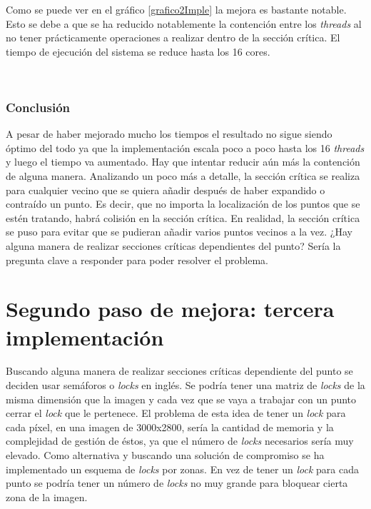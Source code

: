 Como se puede ver en el gr\'{a}fico \ref{grafico2Imple} la mejora es bastante notable. Esto se debe a que se ha reducido notablemente la contenci\'{o}n entre los \textit{threads} al no tener pr\'{a}cticamente operaciones a realizar dentro de la secci\'{o}n cr\'{i}tica. El tiempo de ejecuci\'{o}n del sistema se reduce hasta los 16 cores.

\


\subsubsection{Conclusi\'{o}n}

A pesar de haber mejorado mucho los tiempos el resultado no sigue siendo \'{o}ptimo del todo ya que la implementaci\'{o}n escala poco a poco hasta los 16 \textit{threads} y luego el tiempo va aumentado. Hay que intentar reducir a\'{u}n m\'{a}s la contenci\'{o}n de alguna manera. Analizando un poco m\'{a}s a detalle, la secci\'{o}n cr\'{i}tica se realiza para cualquier vecino que se quiera a\~{n}adir despu\'{e}s de haber expandido o contra\'{i}do un punto. Es decir, que no importa la localizaci\'{o}n de los puntos que se est\'{e}n tratando, habr\'{a} colisi\'{o}n en la secci\'{o}n cr\'{i}tica. En realidad, la secci\'{o}n cr\'{i}tica se puso para evitar que se pudieran a\~{n}adir varios puntos vecinos a la vez. ¿Hay alguna manera de realizar secciones cr\'{i}ticas dependientes del punto? Ser\'{i}a la pregunta clave a responder para poder resolver el problema. 

\section{Segundo paso de mejora: tercera implementaci\'{o}n}

Buscando alguna manera de realizar secciones cr\'{i}ticas dependiente del punto se deciden usar sem\'{a}foros o \textit{locks} en ingl\'{e}s. Se podr\'{i}a tener una matriz de \textit{locks} de la misma dimensi\'{o}n que la imagen y cada vez que se vaya a trabajar con un punto cerrar el \textit{lock} que le pertenece. El problema de esta idea de tener un \textit{lock} para cada p\'{i}xel, en una imagen de 3000x2800, ser\'{i}a la cantidad de memoria y la complejidad de gesti\'{o}n de \'{e}stos, ya que el n\'{u}mero de \textit{locks} necesarios ser\'{i}a muy elevado. Como alternativa y buscando una soluci\'{o}n de compromiso se ha implementado un esquema de \textit{locks} por zonas. En vez de tener un \textit{lock} para cada punto se podr\'{i}a tener un n\'{u}mero de \textit{locks} no muy grande para bloquear cierta zona de la imagen. 

